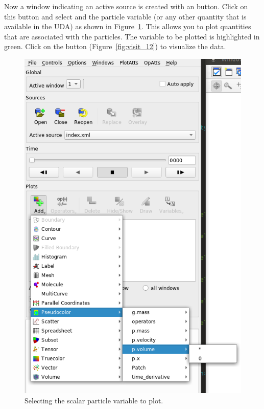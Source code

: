 \begin{paracol}{2}
  \switchcolumn
  Now a window indicating an active source is created with an 
  button.  Click on this button and select  and the
  particle variable  (or any other quantity that is
  available in the UDA) as shown in Figure~\ref{fig:visit_10}.
  This allows you to plot  quantities that are associated
  with the \MPM particles.
  The variable to be plotted is highlighted in green.  Click on the 
  button (Figure~\ref{fig:visit_12}) to visualize the data.

  \begin{figure}[htb!]
    \centering
    \includegraphics[width=0.5\columnwidth]{FIGS/visit/visit_10.png}
    \caption{Selecting the scalar particle variable to plot.}
    \label{fig:visit_10}
  \end{figure}

  \switchcolumn


\end{paracol}
